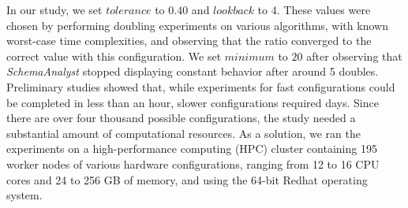 

In our study, we set $\mathit{tolerance}$ to $0.40$ and $\mathit{lookback}$ to $4$. These values were chosen by
performing doubling experiments on various algorithms, with known worst-case time complexities, and observing that the
ratio converged to the correct value with this configuration.  We set $\mathit{minimum}$ to $20$ after observing that
\textit{SchemaAnalyst} stopped displaying constant behavior after around 5 doubles.  Preliminary studies showed that,
while experiments for fast configurations could be completed in less than an hour, slower configurations required days.
Since there are over four thousand possible configurations, the study needed a substantial amount of computational
resources.  As a solution, we ran the experiments on a high-performance computing (HPC) cluster containing 195 worker
nodes of various hardware configurations, ranging from 12 to 16 CPU cores and 24 to 256 GB of memory, and using the
64-bit Redhat operating system.



